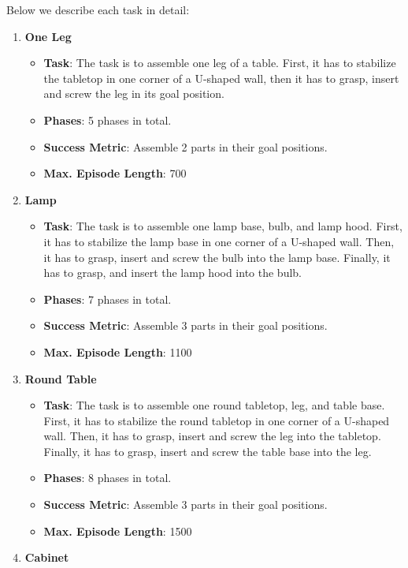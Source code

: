 \documentclass{article} %
\begin{document}
Below we describe each task in detail:
\begin{enumerate}    
    \item \textbf{One Leg} \begin{itemize}
        \item \textbf{Task}: The task is to assemble one leg of a table. First, it has to stabilize the tabletop in one corner of a U-shaped wall, then it has to grasp, insert and screw the leg in its goal position.
        \item \textbf{Phases}: 5 phases in total.
        \item \textbf{Success Metric}: Assemble 2 parts in their goal positions.
        \item \textbf{Max. Episode Length}: 700
        \end{itemize}
    \item \textbf{Lamp} \begin{itemize}
        \item \textbf{Task}: The task is to assemble one lamp base, bulb, and lamp hood. First, it has to stabilize the lamp base in one corner of a U-shaped wall. Then, it has to grasp, insert and screw the bulb into the lamp base. Finally, it has to grasp, and insert the lamp hood into the bulb.
        \item \textbf{Phases}: 7 phases in total.
        \item \textbf{Success Metric}: Assemble 3 parts in their goal positions.
        \item \textbf{Max. Episode Length}: 1100
        \end{itemize}
    \item \textbf{Round Table} \begin{itemize}
        \item \textbf{Task}: The task is to assemble one round tabletop, leg, and table base. First, it has to stabilize the round tabletop in one corner of a U-shaped wall. Then, it has to grasp, insert and screw the leg into the tabletop. Finally, it has to grasp, insert and screw the table base into the leg.
        \item \textbf{Phases}: 8 phases in total.
        \item \textbf{Success Metric}: Assemble 3 parts in their goal positions.
        \item \textbf{Max. Episode Length}: 1500
        \end{itemize}
    \item \textbf{Cabinet} \begin{itemize}

\end{itemize}
\end{enumerate}
\end{document}
